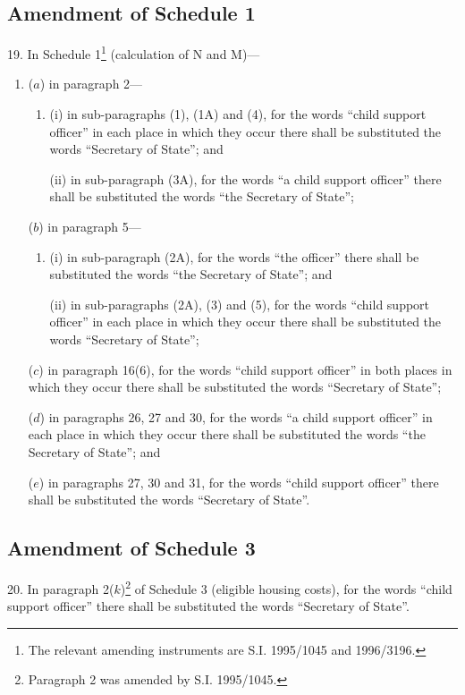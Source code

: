 \documentclass[12pt,a4paper]{article}
\begin{document}
\subsection[19. Amendment of Schedule 1]{Amendment of Schedule 1}

19.  In Schedule 1\footnote{\frenchspacing The relevant amending instruments are S.I. 1995/1045 and 1996/3196.} (calculation of N and M)—
\begin{enumerate}\item[]
($a$) in paragraph 2—
\begin{enumerate}\item[]
(i) in sub-paragraphs (1), (1A) and (4), for the words “child support officer” in each place in which they occur there shall be substituted the words “Secretary of State”; and

(ii) in sub-paragraph (3A), for the words “a child support officer” there shall be substituted the words “the Secretary of State”;
\end{enumerate}

($b$) in paragraph 5—
\begin{enumerate}\item[]
(i) in sub-paragraph (2A), for the words “the officer” there shall be substituted the words “the Secretary of State”; and

(ii) in sub-paragraphs (2A), (3) and (5), for the words “child support officer” in each place in which they occur there shall be substituted the words “Secretary of State”;
\end{enumerate}

($c$) in paragraph 16(6), for the words “child support officer” in both places in which they occur there shall be substituted the words “Secretary of State”;

($d$) in paragraphs 26, 27 and 30, for the words “a child support officer” in each place in which they occur there shall be substituted the words “the Secretary of State”; and

($e$) in paragraphs 27, 30 and 31, for the words “child support officer” there shall be substituted the words “Secretary of State”.
\end{enumerate}

\subsection[20. Amendment of Schedule 3]{Amendment of Schedule 3}

20.  In paragraph 2($k$)\footnote{\frenchspacing Paragraph 2 was amended by S.I. 1995/1045.} of Schedule 3 (eligible housing costs), for the words “child support officer” there shall be substituted the words “Secretary of State”.
\end{document}

